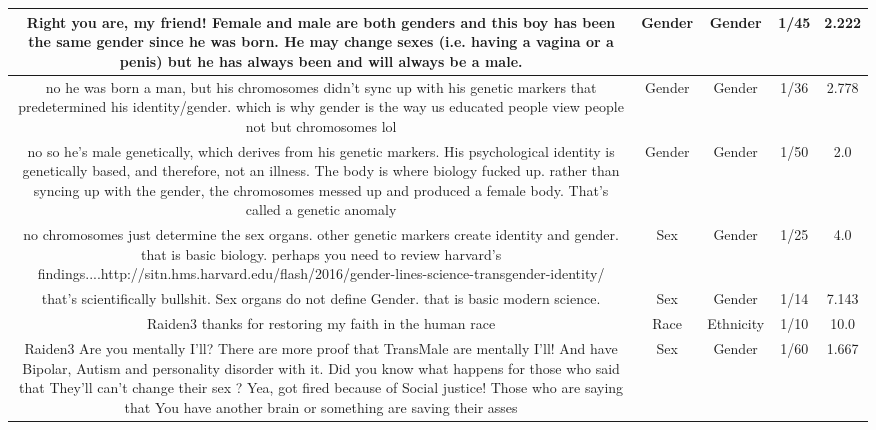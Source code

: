 \documentclass[11pt]{article}
\newlength\mylength
\begin{document}
\begin{center}
\begin{longtable}{|C{.40\mylength}|C{.30\mylength}|C{.15\mylength}|C{.15\mylength}|C{.15\mylength}|}
  Right you are, my friend! Female and male are both genders and this boy has been the same gender since he was born. He may change sexes (i.e. having a vagina or a penis) but he has always been and will always be a male.  & Gender & Gender & 1/45 & 2.222 \\  \hline
  no he was born a man, but his chromosomes didn't sync up with his genetic markers that predetermined his identity/gender. which is why gender is the way us educated people view people not but chromosomes lol  & Gender & Gender & 1/36 & 2.778 \\  \hline
  no so he's male genetically, which derives from his genetic markers. His psychological identity is genetically based, and therefore, not an illness. The body is where biology fucked up. rather than syncing up with the gender, the chromosomes messed up and produced a female body. That's called a genetic anomaly  & Gender & Gender & 1/50 & 2.0 \\  \hline
  no chromosomes just determine the sex organs. other genetic markers create identity and gender.  that is basic biology. perhaps you need to review harvard's findings....http://sitn.hms.harvard.edu/flash/2016/gender-lines-science-transgender-identity/  & Sex & Gender & 1/25 & 4.0 \\  \hline
  that's scientifically bullshit. Sex organs do not define Gender. that is basic modern science.  & Sex & Gender & 1/14 & 7.143 \\  \hline
  Raiden3 thanks for restoring my faith in the human race  & Race & Ethnicity & 1/10 & 10.0 \\  \hline
  Raiden3  Are you mentally I'll? There are more proof that TransMale are mentally I'll! And have Bipolar, Autism and personality disorder with it. Did you know what happens for those who said that  They'll can't change their sex ? Yea, got fired because of Social justice! Those who are saying that  You have another brain or something are saving their asses   & Sex & Gender & 1/60 & 1.667 \\  \hline

\end{longtable}
\end{center}
\end{document}
